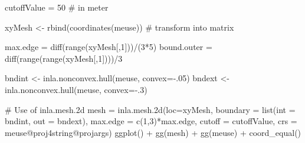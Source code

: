 \documentclass[
  a4paper,
]{article}
\newenvironment{Shaded}{\begin{snugshade}}{\end{snugshade}}
\newcommand{\AttributeTok}[1]{\textcolor[rgb]{0.40,0.45,0.13}{#1}}
\newcommand{\CommentTok}[1]{\textcolor[rgb]{0.37,0.37,0.37}{#1}}
\newcommand{\DecValTok}[1]{\textcolor[rgb]{0.68,0.00,0.00}{#1}}
\newcommand{\FunctionTok}[1]{\textcolor[rgb]{0.28,0.35,0.67}{#1}}
\newcommand{\NormalTok}[1]{\textcolor[rgb]{0.00,0.23,0.31}{#1}}
\newcommand{\OtherTok}[1]{\textcolor[rgb]{0.00,0.23,0.31}{#1}}
\newcommand{\SpecialCharTok}[1]{\textcolor[rgb]{0.37,0.37,0.37}{#1}}
\begin{document}
\begin{Shaded}
\begin{Highlighting}[]
\NormalTok{cutoffValue }\OtherTok{=} \DecValTok{50} \CommentTok{\# in meter}

\NormalTok{xyMesh }\OtherTok{\textless{}{-}} \FunctionTok{rbind}\NormalTok{(}\FunctionTok{coordinates}\NormalTok{(meuse)) }\CommentTok{\# transform into matrix}

\NormalTok{max.edge }\OtherTok{=} \FunctionTok{diff}\NormalTok{(}\FunctionTok{range}\NormalTok{(xyMesh[,}\DecValTok{1}\NormalTok{]))}\SpecialCharTok{/}\NormalTok{(}\DecValTok{3}\SpecialCharTok{*}\DecValTok{5}\NormalTok{)}
\NormalTok{bound.outer }\OtherTok{=} \FunctionTok{diff}\NormalTok{(}\FunctionTok{range}\NormalTok{(}\FunctionTok{range}\NormalTok{(xyMesh[,}\DecValTok{1}\NormalTok{])))}\SpecialCharTok{/}\DecValTok{3}

\NormalTok{bndint }\OtherTok{\textless{}{-}} \FunctionTok{inla.nonconvex.hull}\NormalTok{(meuse, }\AttributeTok{convex=}\SpecialCharTok{{-}}\NormalTok{.}\DecValTok{05}\NormalTok{)}
\NormalTok{bndext }\OtherTok{\textless{}{-}} \FunctionTok{inla.nonconvex.hull}\NormalTok{(meuse, }\AttributeTok{convex=}\SpecialCharTok{{-}}\NormalTok{.}\DecValTok{3}\NormalTok{)}

\CommentTok{\# Use of inla.mesh.2d }
\NormalTok{mesh }\OtherTok{=} \FunctionTok{inla.mesh.2d}\NormalTok{(}\AttributeTok{loc=}\NormalTok{xyMesh,}
                    \AttributeTok{boundary =} \FunctionTok{list}\NormalTok{(}\AttributeTok{int =}\NormalTok{ bndint,}
                                    \AttributeTok{out =}\NormalTok{ bndext),}
                    \AttributeTok{max.edge =} \FunctionTok{c}\NormalTok{(}\DecValTok{1}\NormalTok{,}\DecValTok{3}\NormalTok{)}\SpecialCharTok{*}\NormalTok{max.edge, }
                    \AttributeTok{cutoff =}\NormalTok{ cutoffValue,}
                    \AttributeTok{crs =}\NormalTok{ meuse}\SpecialCharTok{@}\NormalTok{proj4string}\SpecialCharTok{@}\NormalTok{projargs)}
\FunctionTok{ggplot}\NormalTok{() }\SpecialCharTok{+}
  \FunctionTok{gg}\NormalTok{(mesh) }\SpecialCharTok{+}
  \FunctionTok{gg}\NormalTok{(meuse) }\SpecialCharTok{+}
  \FunctionTok{coord\_equal}\NormalTok{()}
\end{Highlighting}
\end{Shaded}
\end{document}
